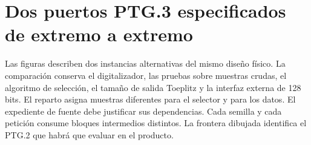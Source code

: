 \section{Dos puertos PTG.3 especificados de extremo a extremo}
\label{sec:dos-puertos}

Las figuras describen dos instancias alternativas del mismo diseño físico. La
comparación conserva el digitalizador, las pruebas sobre muestras crudas,
el algoritmo de selección, el tamaño de salida Toeplitz y la interfaz
externa de 128 bits. El reparto asigna muestras diferentes para el selector
y para los datos. El expediente de fuente debe justificar sus dependencias.
Cada semilla y cada petición consume bloques intermedios distintos. La
frontera dibujada identifica el PTG.2 que habrá que evaluar en el producto.

\newcommand{\flujoPTGComparado}[3]{%
\resizebox{\linewidth}{!}{%
\begin{tikzpicture}[
  x=1cm,y=1cm,>=Latex,
  caja/.style={draw=blue!55!black,fill=blue!4,rounded corners=2pt,
    text width=24mm,minimum height=10mm,align=center,font=\small,inner sep=3pt},
  salud/.style={caja,draw=orange!65!black,fill=orange!7},
  nucleo/.style={caja,draw=violet!65!black,fill=violet!6},
  flujo/.style={->,semithick}, control/.style={->,dashed,orange!70!black},
  etiqueta/.style={font=\scriptsize,fill=white,inner sep=1pt}]
\node[caja] (raw) at (0,0) {Fuente física\\y digitalizador};
\node[salud] (tests) at (3.1,0) {Pruebas raw\\y cuarentena};
\node[caja] (alloc) at (6.3,0) {Reparto de\\adquisiciones};
\node[caja] (sel) at (6.3,1.35) {Renovación\\del selector};
\node[caja] (toe) at (9.8,0) {Toeplitz\\$A_i=T_{U_i}R_i$};
\node[caja,text width=31mm] (init) at (3.1,-2.4) {#1};
\node[nucleo] (reg) at (6.8,-2.4) {#2};
\node[nucleo,text width=30mm] (gen) at (10.35,-2.4) {#3};
\node[salud] (out) at (14.0,-2.4) {Puerto $Y_i$\\128 bits};
\begin{scope}[on background layer]
  \node[fit=(raw)(tests)(alloc)(sel)(toe),inner sep=3mm,
    rounded corners,draw=blue!35,fill=blue!2] (inner) {};
\end{scope}
\node[anchor=north west,font=\footnotesize,text=blue!55!black] at (inner.north west)
  {PTRNG interno PTG.2};
\draw[flujo] (raw)--(tests);
\draw[flujo] (tests)--(alloc);
\draw[flujo] (alloc)--node[etiqueta,above]{$R_i$}(toe);

\end{tikzpicture}}}
